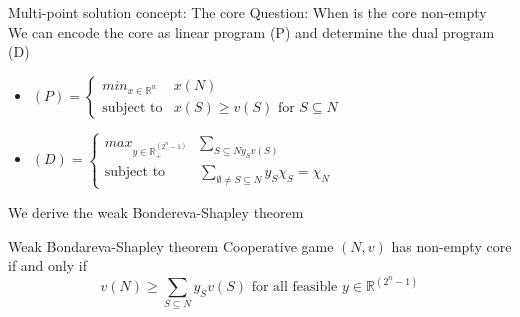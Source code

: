 \documentclass{beamer}
\newcommand{\R}{\mathbb{R}}
\begin{document}
\begin{frame}{Multi-point solution concept: The core}
    Question: When is the core non-empty \\
	We can encode the core as linear program (P) and determine the dual program (D)
    \begin{itemize}
		\item $\left(P\right)=\begin{cases}
			min_{x \in \R^n} & x \left(N\right) \\
			\text{subject to} &x\left(S\right) \geq v\left(S\right)\text{ for }S \subseteq N
		\end{cases}$
		\item $\left(D\right)=\begin{cases}
			max_{y \in \R_{+}^{\left(2^n-1\right)}} & \sum_{S \subseteq N y_S v\left(S\right)} \\
			\text{subject to} & \sum_{\emptyset \neq S \subseteq N} y_S \chi_S = \chi_N
		\end{cases}$
	\end{itemize}
	We derive the weak Bondereva-Shapley theorem
	\begin{block}{Weak Bondareva-Shapley theorem}
		Cooperative game $\left(N,v\right)$ has non-empty core if and only if 
		\[
			v\left(N\right) \geq \sum_{S \subseteq N} y_S v\left(S\right)\text{ for all feasible }y \in \R^{\left(2^n-1\right)}
		\]
	\end{block}
\end{frame}


\end{document}
